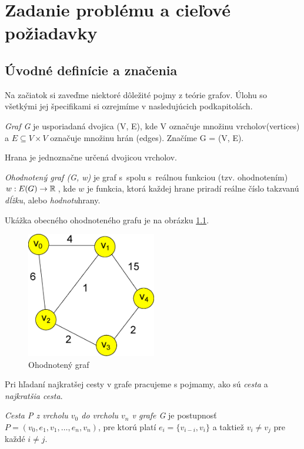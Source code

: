 \chapter{Zadanie problému a cieľové požiadavky}

\section{Úvodné definície a značenia}
Na začiatok si zaveďme niektoré dôležité pojmy z teórie grafov.
Úlohu so všetkými jej špecifikami si ozrejmíme v nasledujúcich podkapitolách.
\begin{define}
{\sl Graf G} je usporiadaná dvojica (V, E), kde V označuje množinu vrcholov(vertices) a $E \subseteq V \times V $ označuje množinu hrán (edges). Značíme G = (V, E).
\end{define}


\begin{note}
Hrana je jednoznačne určená dvojicou vrcholov.
\end{note}


\begin{define}
{\sl Ohodnotený graf (G, w)} je graf s~spolu s~reálnou funkciou (tzv. ohodnotením)
$w: E(G) \to \mathbb{R}\,$, kde $w$ je funkcia, ktorá každej hrane priradí
reálne číslo takzvanú \emph{dĺžku}, alebo \emph{hodnotu}hrany.
\end{define}

Ukážka obecného ohodnoteného grafu je na obrázku \ref{fig:ohodnoteny_graf}.

\begin{figure}[h]
\centering
\includegraphics[height=5.5cm]{./img/graf.eps}
\caption{Ohodnotený graf}
\label{fig:ohodnoteny_graf}
\end{figure}

Pri hľadaní najkratšej cesty v grafe pracujeme s pojmamy, ako 
sú \emph{cesta} a \emph{najkratšia cesta}.

\begin{define}
{\sl Cesta P z vrcholu $v_0$ do vrcholu $v_n$ v grafe G } je postupnosť $P = (v_{0},e_{1},v_{1},\dots, e_{n}, v_{n})$,
pre ktorú platí $e_{i} = \{v_{i-i},v_{i}\}$ a taktiež
$v_{i} \ne v_{j}$ pre každé $i \ne j$.
\end{define}

